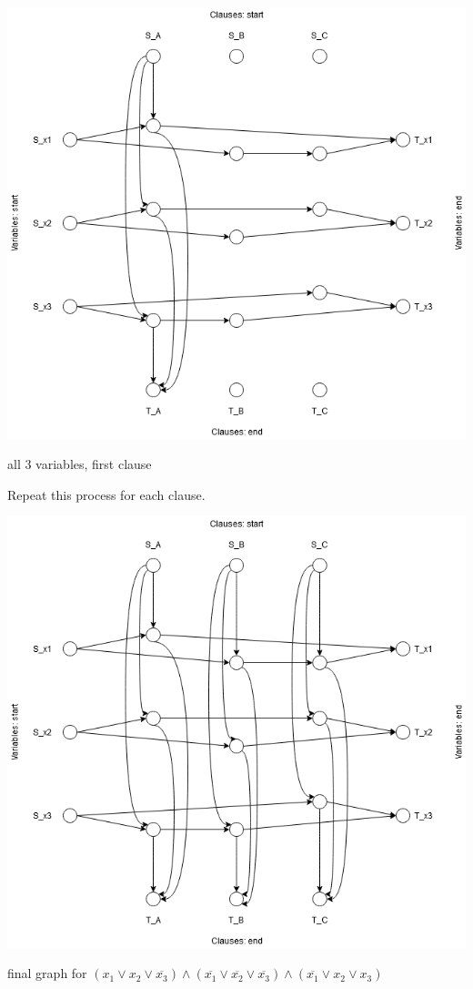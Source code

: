 \documentclass[a4paper]{article}
\begin{document}
\begin{center}
    \includegraphics[scale=.5]{hw11-1clause.png}
    
    \caption{all 3 variables, first clause}
\end{center}

Repeat this process for each clause.

\begin{center}
    \includegraphics[scale=.5]{hw11-final.png}
    
    \caption{final graph for $(x_1 \vee x_2 \vee \overline{x_3}) \wedge (\overline{x_1} \vee \overline{x_2} \vee \overline{x_3}) \wedge (\overline{x_1} \vee x_2 \vee x_3)$ }
\end{center}
\end{document}
